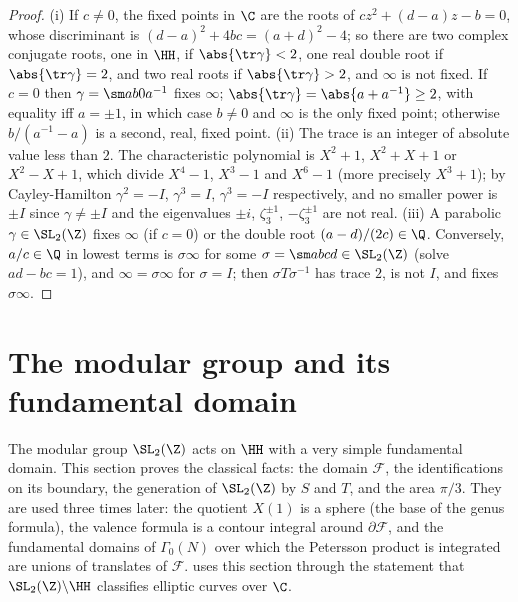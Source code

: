 \begin{proof}
(i) If $c\ne0$, the fixed points in $\C$ are the roots of $cz^2+(d-a)z-b=0$, whose discriminant is $(d-a)^2+4bc=(a+d)^2-4$; so there are two complex
conjugate roots, one in $\HH$, if $\abs{\tr\gamma}<2$, one real double root if $\abs{\tr\gamma}=2$, and two real roots if $\abs{\tr\gamma}>2$, and $\infty$ is not
fixed. If $c=0$ then $\gamma=\sm a b0{a^{-1}}$ fixes $\infty$; $\abs{\tr\gamma}=\abs{a+a^{-1}}\ge2$, with equality iff $a=\pm1$, in which case $b\ne0$ and $\infty$ is the
only fixed point; otherwise $b/(a^{-1}-a)$ is a second, real, fixed point.
(ii) The trace is an integer of absolute value less than $2$. The characteristic polynomial is $X^2+1$, $X^2+X+1$ or $X^2-X+1$, which divide $X^4-1$,
$X^3-1$ and $X^6-1$ (more precisely $X^3+1$); by Cayley-Hamilton $\gamma^2=-I$, $\gamma^3=I$, $\gamma^3=-I$ respectively, and no smaller power is $\pm I$
since $\gamma\ne\pm I$ and the eigenvalues $\pm i$, $\zeta_3^{\pm1}$, $-\zeta_3^{\pm1}$ are not real.
(iii) A parabolic $\gamma\in\SL_2(\Z)$ fixes $\infty$ (if $c=0$) or the double root $(a-d)/(2c)\in\Q$. Conversely, $a/c\in\Q$ in lowest terms is $\sigma\infty$ for
some $\sigma=\sm abcd\in\SL_2(\Z)$ (solve $ad-bc=1$), and $\infty=\sigma\infty$ for $\sigma=I$; then $\sigma T\sigma^{-1}$ has trace $2$, is not $I$, and fixes $\sigma\infty$.
\end{proof}

\section{The modular group and its fundamental domain}\label{sec:modforms:modular-group}

The modular group $\SL_2(\Z)$ acts on $\HH$ with a very simple fundamental domain. This section proves the classical facts: the
domain $\mathcal F$, the identifications on its boundary, the generation of $\SL_2(\Z)$ by $S$ and $T$, and the area $\pi/3$. They are used three
times later: the quotient $X(1)$ is a sphere (the base of the genus formula), the valence formula is a contour integral around
$\partial\mathcal F$, and the fundamental domains of $\Gamma_0(N)$ over which the Petersson product is integrated are unions of translates of $\mathcal F$.
 uses this section through the statement that $\SL_2(\Z)\backslash\HH$ classifies elliptic curves over $\C$.

